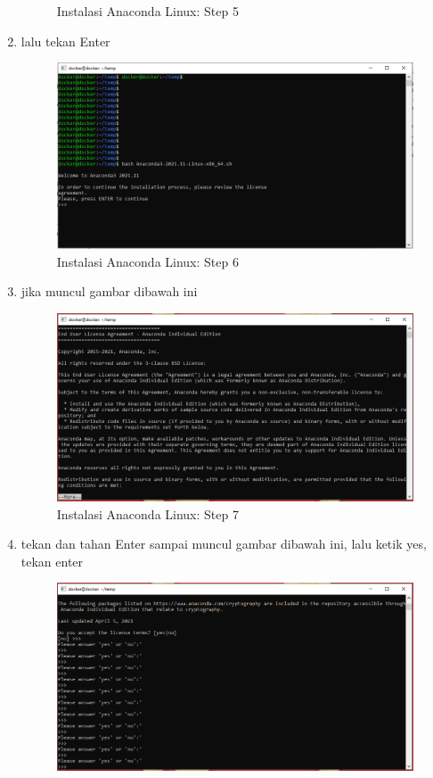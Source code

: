 \begin{enumerate}
\begin{figure}[H]
        \caption{Instalasi Anaconda Linux: Step 5}
\end{figure}
\item lalu tekan Enter
\begin{figure}[H]
        \centerline{\includegraphics[scale=0.5]{figures/instalasi-anaconda-linux/step6}}
        \caption{Instalasi Anaconda Linux: Step 6}
\end{figure}
\item jika muncul gambar dibawah ini
\begin{figure}[H]
        \centerline{\includegraphics[scale=0.5]{figures/instalasi-anaconda-linux/step7}}
        \caption{Instalasi Anaconda Linux: Step 7}
\end{figure}
\item tekan dan tahan Enter sampai muncul gambar dibawah ini, lalu ketik yes, tekan enter
\begin{figure}[H]
        \centerline{\includegraphics[scale=0.5]{figures/instalasi-anaconda-linux/step8}}

\end{figure}
\end{enumerate}
